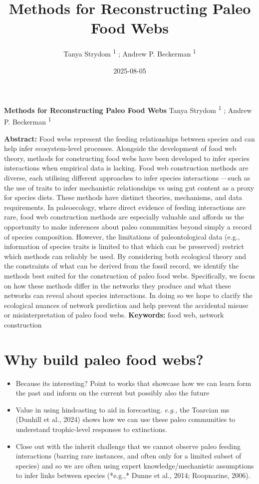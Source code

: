 \documentclass[
]{article}
\title{Methods for Reconstructing Paleo Food Webs}
\author{Tanya Strydom %
%
\textsuperscript{%
%
1%
}%
; Andrew P. Beckerman %
%
\textsuperscript{%
%
1%
}%
}
\date{2025-08-05}
\begin{document}
\thispagestyle{empty}
{\bfseries\sffamily\Large Methods for Reconstructing Paleo Food Webs}
\vfil
Tanya Strydom %
%
\textsuperscript{%
%
1%
}%
; Andrew P. Beckerman %
%
\textsuperscript{%
%
1%
}%

\vfil
{\small
\textbf{Abstract:} Food webs represent the feeding relationships between
species and can help infer ecosystem-level processes. Alongside the
development of food web theory, methods for constructing food webs have
been developed to infer species interactions when empirical data is
lacking. Food web construction methods are diverse, each utilising
different approaches to infer species interactions ---such as the use of
traits to infer mechanistic relationships vs using gut content as a
proxy for species diets. These methods have distinct theories,
mechanisms, and data requirements. In paleoecology, where direct
evidence of feeding interactions are rare, food web construction methods
are especially valuable and affords us the opportunity to make
inferences about paleo communities beyond simply a record of species
composition. However, the limitations of paleontological data (e.g.,
information of species traits is limited to that which can be preserved)
restrict which methods can reliably be used. By considering both
ecological theory and the constraints of what can be derived from the
fossil record, we identify the methods best suited for the construction
of paleo food webs. Specifically, we focus on how these methods differ
in the networks they produce and what these networks can reveal about
species interactions. In doing so we hope to clarify the ecological
nuances of network prediction and help prevent the accidental misuse or
misinterpretation of paleo food webs.
\vfil
\textbf{Keywords:} %
food web, %
network construction%
}
\clearpage
\setcounter{page}{1}
\doublespacing
\linenumbers


\section{Why build paleo food webs?}\label{why-build-paleo-food-webs}

\begin{itemize}
\item
  Because its interesting? Point to works that showcase how we can learn
  form the past and inform on the current but possibly also the future
\item
  Value in using hindcasting to aid in forecasting. \emph{e.g.,} the
  Toarcian ms (Dunhill et al., 2024) shows how we can use these paleo
  communities to understand trophic-level responses to extinctions.
\item
  Close out with the inherit challenge that we cannot observe paleo
  feeding interactions (barring rare instances, and often only for a
  limited subset of species) and so we are often using expert
  knowledge/mechanistic assumptions to infer links between species
  (*e.g.,* Dunne et al., 2014; Roopnarine, 2006).
\end{itemize}
\end{document}
